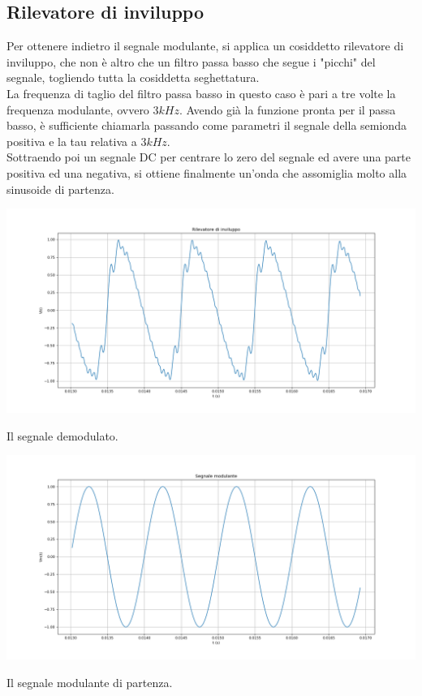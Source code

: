 \documentclass{article}
\begin{document}
\subsection{Rilevatore di inviluppo}
Per ottenere indietro il segnale modulante, si applica un cosiddetto rilevatore di inviluppo, che non è altro che un filtro
passa basso che segue i "picchi" del segnale, togliendo tutta la cosiddetta seghettatura.
\\
La frequenza di taglio del filtro passa basso in questo caso è pari a tre volte la frequenza modulante, ovvero $3 kHz$.
Avendo già la funzione pronta per il passa basso, è sufficiente chiamarla passando come parametri il segnale della semionda
positiva e la tau relativa a $3 kHz$.
\\
Sottraendo poi un segnale DC per centrare lo zero del segnale ed avere una parte positiva ed una negativa, si ottiene finalmente
un'onda che assomiglia molto alla sinusoide di partenza.

\begin{center}
    \includegraphics[width=\textwidth]{inviluppo.png}
\end{center}
Il segnale demodulato.

\begin{center}
    \includegraphics[width=\textwidth]{modulante.png}
\end{center}
Il segnale modulante di partenza.
\end{document}

